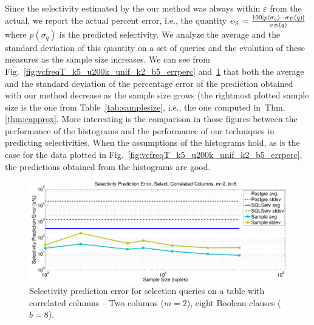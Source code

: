 Since the selectivity estimated by the our method was always within $\varepsilon$
from the actual, we report the actual percent error, i.e., the quantity
$e_\%=\frac{100|p(\sigma_q)-\sigma_{\cal D}(q)|}{\sigma_{\cal D}(q)}$ where $p(\sigma_q)$
is the predicted selectivity. We analyze the average and the standard deviation
of this quantity on a set of queries and the evolution of these measures as
the sample size increases. We can see from
Fig.~\ref{fig:vcfreqT_k5_u200k_unif_k2_b5_errperc}
and~\ref{fig:vcfreqT_k2_correl_k2_b8_errperc} that both the average and the standard
deviation of the percentage error of the prediction obtained with our method
decrease as the sample size grows (the rightmost plotted
sample size is the one from Table~\ref{tab:samplesize}, i.e., the one computed 
in~Thm.\ref{thm:eapprox}. More interesting is the comparison in those figures between the performance of the
histograms and the performance of our techniques in predicting selectivities. When
the assumptions of the histograms hold, as is the case for the data plotted in
Fig.~\ref{fig:vcfreqT_k5_u200k_unif_k2_b5_errperc}, the predictions obtained from the
histograms are good. 

\begin{figure}[htbp]
  \centering
  \includegraphics[scale=0.3]{vcfreq/T_k2_correl_k2_b8_errperc}
  \caption{Selectivity prediction error for selection queries on a table with
  correlated columns -- Two columns ($m=2$), eight Boolean clauses ($b=8$).}
  \label{fig:vcfreqT_k2_correl_k2_b8_errperc}
\end{figure}

